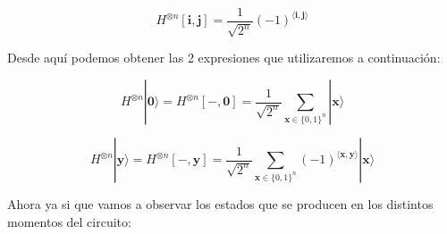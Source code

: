  \begin{equation}H^{\otimes n} [\mathbf{i},\mathbf{j}] = \dfrac{1}{\sqrt{2^{n}}}(-1)^{\langle\mathbf{i},\mathbf{j}\rangle}\end{equation}

 Desde aquí podemos obtener las 2 expresiones que utilizaremos a continuación:

 \begin{equation}
     H^{\otimes n}|\mathbf{0}\rangle=H^{\otimes n}[-,\mathbf{0}]=\dfrac{1}{\sqrt{2^{n}}}\sum_{\mathbf{x} \in \{0,1\}^{n}} |\mathbf{x}\rangle
 \end{equation}

 \begin{equation}
     H^{\otimes n}|\mathbf{y}\rangle=H^{\otimes n}[-,\mathbf{y}]=\dfrac{1}{\sqrt{2^{n}}}\sum_{\mathbf{x} \in \{0,1\}^{n}} (-1)^{\langle\mathbf{x},\mathbf{y}\rangle}|\mathbf{x}\rangle
 \end{equation}
 
 Ahora ya si que vamos a observar los estados que se producen en los distintos momentos del circuito:

